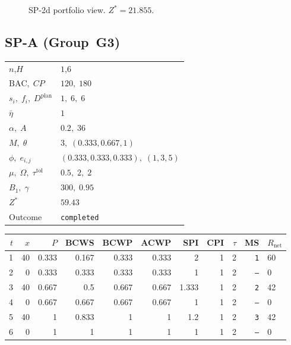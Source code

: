 \documentclass[12pt, a4paper]{article}
\newcommand{\BAC}{\mathrm{BAC}}
\begin{document}
\begin{figure}[htbp]
\begin{tikzpicture}[font=\footnotesize]
\end{tikzpicture}
\caption{SP-2d portfolio view. $Z^*=21.855$.}
\label{fig:sp2d_portfolio}
\end{figure}

\newpage

\subsection*{SP-A  (Group~G3)}
\begin{center}
\begin{tabular}{ll}
\toprule
$n$,\;$H$ & $1$,\;$6$ \\
$\BAC,\;CP$ & $120,\;180$ \\
$s_i,\;f_i,\;D^{\mathrm{plan}}$ & $1,\;6,\;6$ \\
$\bar\eta$ & $1$ \\
$\alpha,\;A$ & $0.2,\;36$ \\
$M,\;\theta$ & $3,\;(0.333,0.667,1)$ \\
$\phi,\;e_{i,j}$ & $(0.333,0.333,0.333),\;(1,3,5)$ \\
$\mu,\;\Omega,\;\tau^{\mathrm{tol}}$ & $0.5,\;2,\;2$ \\
$B_1,\;\gamma$ & $300,\;0.95$ \\
$Z^*$ & $59.43$ \\
Outcome & \texttt{completed} \\
\bottomrule
\end{tabular}
\end{center}

\begin{center}
\begin{tabular}{rrrrrrrrrrl}
\toprule
$t$ & $x$ & $P$ & BCWS & BCWP & ACWP & SPI & CPI & $\tau$ & MS & $R_{\mathrm{net}}$\\
\midrule
1 & 40 & 0.333 & 0.167 & 0.333 & 0.333 & 2 & 1 & 2 & \texttt{1} & 60 \\
2 & 0 & 0.333 & 0.333 & 0.333 & 0.333 & 1 & 1 & 2 & \texttt{---} & 0 \\
3 & 40 & 0.667 & 0.5 & 0.667 & 0.667 & 1.333 & 1 & 2 & \texttt{2} & 42 \\
4 & 0 & 0.667 & 0.667 & 0.667 & 0.667 & 1 & 1 & 2 & \texttt{---} & 0 \\
5 & 40 & 1 & 0.833 & 1 & 1 & 1.2 & 1 & 2 & \texttt{3} & 42 \\
6 & 0 & 1 & 1 & 1 & 1 & 1 & 1 & 2 & \texttt{---} & 0 \\
\bottomrule
\end{tabular}
\end{center}
\end{document}
